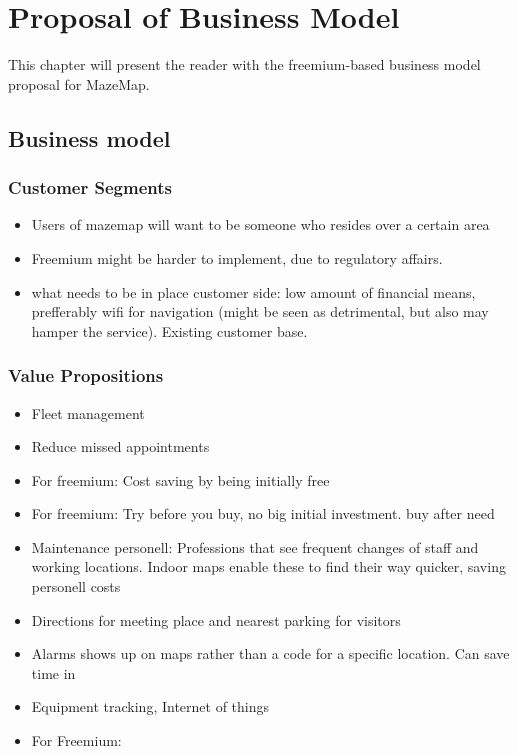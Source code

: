 \chapter{Proposal of Business Model}
This chapter will present the reader with the freemium-based business model proposal for MazeMap. 


\section{Business model}
\subsection{Customer Segments}

\begin{itemize}
    \item Users of mazemap will want to be someone who resides over a certain area
    \item Freemium might be harder to implement, due to regulatory affairs.
    \item what needs to be in place customer side: low amount of financial means, prefferably wifi for navigation (might be seen as detrimental, but also may hamper the service). Existing customer base. 
\end{itemize}

\subsection{Value Propositions}

\begin{itemize}
    \item  Fleet management
    \item Reduce missed appointments
    \item For freemium: Cost saving by being initially free
    \item For freemium: Try before you buy, no big initial investment. buy after need
    \item Maintenance personell: Professions that see frequent changes of staff and working locations. Indoor maps enable these to find their way quicker, saving personell costs
    \item Directions for meeting place and nearest parking for visitors
    \item Alarms shows up on maps rather than a code for a specific location. Can save time in 
    \item Equipment tracking, Internet of things
    \item For Freemium: 
\end{itemize}

